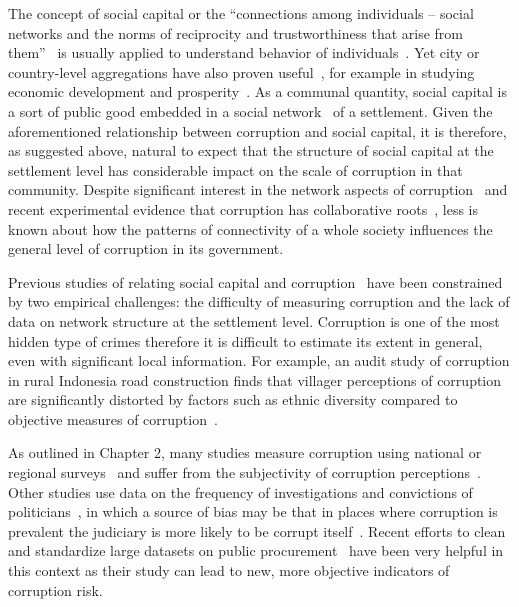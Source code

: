 The concept of social capital or the ``connections among individuals – social networks and the norms of reciprocity and trustworthiness that arise from them''~\cite{putnam2001bowling} is usually applied to understand behavior of individuals~\cite{portes1998social}. Yet city or country-level  aggregations have also proven useful~\cite{putnam2001bowling}, for example in studying economic development and prosperity~\cite{westlund2010social}. As a communal quantity, social capital is a sort of public good embedded in a social network~\cite{lin2002social} of a settlement. Given the aforementioned relationship between corruption and social capital, it is therefore, as suggested above, natural to expect that the structure of social capital at the settlement level has considerable impact on the scale of corruption in that community. Despite significant interest in the network aspects of corruption~\cite{gambetta1996sicilian} and recent experimental evidence that corruption has collaborative roots~\cite{weisel2015collaborative}, less is known about how the patterns of connectivity of a whole society influences the general level of corruption in its government.

Previous studies of relating social capital and corruption~\cite{harris2007,bjornskov2003corruption} have been constrained by two empirical challenges: the difficulty of measuring corruption and the lack of data on network structure at the settlement level. Corruption is one of the most hidden type of crimes therefore it is difficult to estimate its extent in general, even with significant local information. For example, an audit study of corruption in rural Indonesia road construction finds that villager perceptions of corruption are significantly distorted by factors such as ethnic diversity compared to objective measures of corruption~\cite{olken2009corruption}.

As outlined in Chapter 2, many studies measure corruption using national or regional surveys~\cite{mungiu2013controlling} and suffer from the subjectivity of corruption perceptions~\cite{torsello2016anthropology}. Other studies use data on the frequency of investigations and convictions of politicians~\cite{glaeser2006corruption}, in which a source of bias may be that in places where corruption is prevalent the judiciary is more likely to be corrupt itself~\cite{transparency2007global}. Recent efforts to clean and standardize large datasets on public procurement~\cite{fazekas2017uncovering} have been very helpful in this context as their study can lead to new, more objective indicators of corruption risk.

